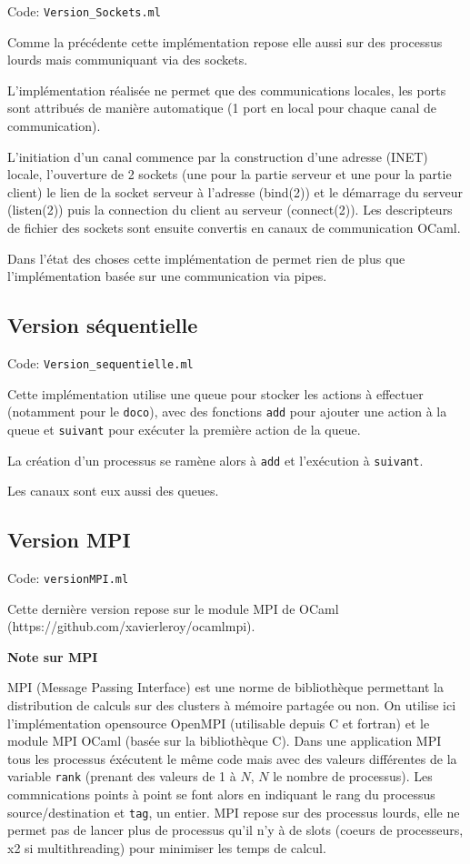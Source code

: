 \documentclass[a4paper]{article}
\begin{document}
Code: \verb|Version_Sockets.ml|

Comme la précédente cette implémentation repose elle aussi sur des processus lourds mais communiquant via des sockets.

L'implémentation réalisée ne permet que des communications locales, les ports sont attribués de manière automatique (1 port en local pour chaque canal de communication).

L'initiation d'un canal commence par la construction d'une adresse (INET) locale, l'ouverture de 2 sockets (une pour la partie serveur et une pour la partie client) le lien de la socket serveur à l'adresse (bind(2)) et le démarrage du serveur (listen(2)) puis la connection du client au serveur (connect(2)). Les descripteurs de fichier des sockets sont ensuite convertis en canaux de communication OCaml.

Dans l'état des choses cette implémentation de permet rien de plus que l'implémentation basée sur une communication via pipes.

\subsection{Version séquentielle}

Code: \verb|Version_sequentielle.ml|

Cette implémentation utilise une queue pour stocker les actions à effectuer (notamment pour le \texttt{doco}), avec des fonctions \texttt{add} pour ajouter une action à la queue et \texttt{suivant} pour exécuter la première action de la queue.

La création d'un processus se ramène alors à \texttt{add} et l'exécution à \texttt{suivant}.

Les canaux sont eux aussi des queues. 

\subsection{Version MPI}

Code: \verb|versionMPI.ml|

Cette dernière version repose sur le module MPI de OCaml (https://github.com/xavierleroy/ocamlmpi).

\textbf{Note sur MPI}

MPI (Message Passing Interface) est une norme de bibliothèque permettant la distribution de calculs sur des clusters à mémoire partagée ou non. On utilise ici l'implémentation opensource OpenMPI (utilisable depuis C et fortran) et le module MPI OCaml (basée sur la bibliothèque C). Dans une application MPI tous les processus éxécutent le même code mais avec des valeurs différentes de la variable \verb|rank| (prenant des valeurs de 1 à $N$, $N$ le nombre de processus). Les commnications points à point se font alors en indiquant le rang du processus source/destination et \verb|tag|, un entier. MPI repose sur des processus lourds, elle ne permet pas de lancer plus de processus qu'il n'y à de slots (coeurs de processeurs, x2 si multithreading) pour minimiser les temps de calcul.
\end{document}

